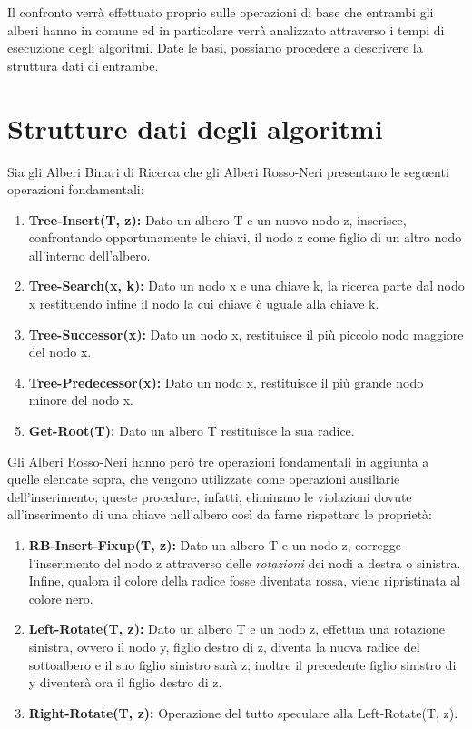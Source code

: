 \documentclass{article}
\begin{document}
Il confronto verrà effettuato proprio sulle operazioni di base che entrambi gli alberi hanno in comune ed in particolare verrà analizzato attraverso i tempi di esecuzione degli algoritmi.
Date le basi, possiamo procedere a descrivere la struttura dati di entrambe.

\section{Strutture dati degli algoritmi}
Sia gli Alberi Binari di Ricerca che gli Alberi Rosso-Neri presentano le seguenti operazioni fondamentali:
\begin{enumerate}[label={\roman*.)}, ref={\roman*.)}]
    \item \textbf{Tree-Insert(T, z):} Dato un albero T e un nuovo nodo z, inserisce, confrontando opportunamente le chiavi, il nodo z come figlio di un altro nodo all’interno dell'albero.
    \item \textbf{Tree-Search(x, k):} Dato un nodo x e una chiave k, la ricerca parte dal nodo x restituendo infine il nodo la cui chiave è uguale alla chiave k.
    \item \textbf{Tree-Successor(x):} Dato un nodo x, restituisce il più piccolo nodo maggiore del nodo x.
    \item \textbf{Tree-Predecessor(x):} Dato un nodo x, restituisce il più grande nodo minore del nodo x.
    \item \textbf{Get-Root(T):} Dato un albero T restituisce la sua radice.
\end{enumerate}
Gli Alberi Rosso-Neri hanno però tre operazioni fondamentali in aggiunta a quelle elencate sopra, che vengono utilizzate come operazioni ausiliarie dell'inserimento; queste procedure, infatti, eliminano le violazioni dovute all’inserimento di una chiave nell'albero così da farne rispettare le proprietà:
\begin{enumerate}[label={\roman*.)}, ref={\roman*.)}]
    \item \textbf{RB-Insert-Fixup(T, z):} Dato un albero T e un nodo z, corregge l'inserimento del nodo z attraverso delle \textit{rotazioni} dei nodi a destra o sinistra. Infine, qualora il colore della radice fosse diventata rossa, viene ripristinata al colore nero.
    \item \textbf{Left-Rotate(T, z):} Dato un albero T e un nodo z, effettua una rotazione sinistra, ovvero il nodo y, figlio destro di z, diventa la nuova radice del sottoalbero e il suo figlio sinistro sarà z; inoltre il precedente figlio sinistro di y diventerà ora il figlio destro di z.
    \item \textbf{Right-Rotate(T, z):} Operazione del tutto speculare alla Left-Rotate(T, z).
\end{enumerate}
\end{document}
